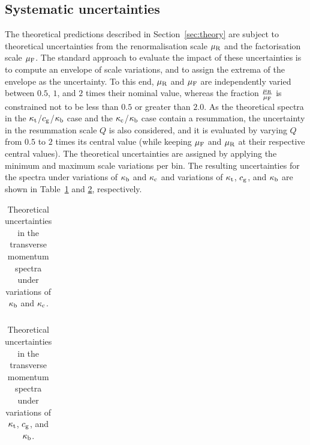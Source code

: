 \subsection{Systematic uncertainties}


The theoretical predictions described in Section~\ref{sec:theory} are subject to theoretical uncertainties from the renormalisation scale $\mu_\mathrm{R}$ and the factorisation scale $\mu_\mathrm{F}$.
% 
The standard approach to evaluate the impact of these uncertainties is to compute an envelope of scale variations, and to assign the extrema of the envelope as the uncertainty.
% 
To this end, $\mu_\mathrm{R}$ and $\mu_\mathrm{F}$ are independently varied between $0.5$, $1$, and $2$ times their nominal value, whereas the fraction $\frac{\mu_\mathrm{R}}{\mu_\mathrm{F}}$ is constrained not to be less than $0.5$ or greater than $2.0$.
% 
As the theoretical spectra in the $\kappa_{\mathrm{t}}$/$c_\mathrm{g}$/$\kappa_{\mathrm{b}}$ case and the $\kappa_{\mathrm{c}}$/$\kappa_{\mathrm{b}}$ case contain a resummation, the uncertainty in the resummation scale $Q$ is also considered, and it is evaluated by varying $Q$ from $0.5$ to $2$ times its central value (while keeping $\mu_\mathrm{F}$ and $\mu_\mathrm{R}$ at their respective central values).
% 
The theoretical uncertainties are assigned by applying the minimum and maximum scale variations per bin.
% 
The resulting uncertainties for the spectra under variations of $\kappa_{\mathrm{b}}$ and $\kappa_{\mathrm{c}}$ and variations of $\kappa_{\mathrm{t}}$, $c_\mathrm{g}$, and $\kappa_{\mathrm{b}}$ are shown in Table~\ref{tab:TheoryUncertainties_kappab_kappac} and \ref{tab:TheoryUncertainties_kappat_kappag}, respectively.


\begin{table}[htb]
\caption{
    Theoretical uncertainties in the transverse momentum spectra under variations of $\kappa_{\mathrm{b}}$ and $\kappa_{\mathrm{c}}$.
    }
\label{tab:TheoryUncertainties_kappab_kappac}
\footnotesize
\begin{center}
\begin{tabular}{lccccc}
\hline

\hline
\end{tabular}
\end{center}
\end{table}

\begin{table}[htb]
\caption{
    Theoretical uncertainties in the transverse momentum spectra under variations of $\kappa_{\mathrm{t}}$, $c_\mathrm{g}$, and $\kappa_{\mathrm{b}}$.
    }
\label{tab:TheoryUncertainties_kappat_kappag}
\footnotesize
\begin{center}
\setlength{\tabcolsep}{2pt}
\begin{tabular}{lccccccccc}
\hline

\hline
\end{tabular}
\end{center}
\end{table}


